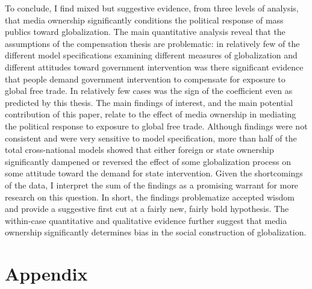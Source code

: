 \documentclass[12pt]{report}
\begin{document}
To conclude, I find mixed but suggestive evidence, from three levels of analysis, that media ownership significantly conditions the political response of mass publics toward globalization. The main quantitative analysis reveal that the assumptions of the compensation thesis are problematic: in relatively few of the different model specifications examining different measures of globalization and different attitudes toward government intervention was there significant evidence that people demand government intervention to compensate for exposure to global free trade. In relatively few cases was the sign of the coefficient even as predicted by this thesis. The main findings of interest, and the main potential contribution of this paper, relate to the effect of media ownership in mediating the political response to exposure to global free trade. Although findings were not consistent and were very sensitive to model specification, more than half of the total cross-national models showed that either foreign or state ownership significantly dampened or reversed the effect of some globalization process on some attitude toward the demand for state intervention. Given the shortcomings of the data, I interpret the sum of the findings as a promising warrant for more research on this question. In short, the findings problematize accepted wisdom and provide a suggestive first cut at a fairly new, fairly bold hypothesis. The within-case quantitative and qualitative evidence further suggest that media ownership significantly determines bias in the social construction of globalization.


\section{Appendix}
\end{document}
